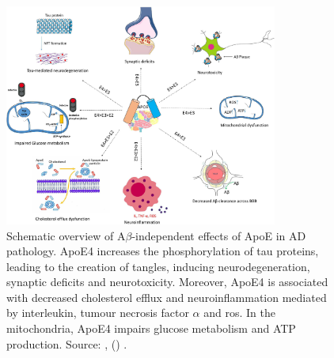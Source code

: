 \documentclass{amsart}
\begin{document}
\begin{figure}[b]
  \includegraphics[width=0.8\textwidth]{figures/ApoEeffectsA.jpg}
    \caption{Schematic overview of A$\beta$-independent effects of ApoE in AD pathology. ApoE4 increases the phosphorylation of tau proteins, leading to the creation of tangles, inducing neurodegeneration, synaptic deficits and neurotoxicity. Moreover, ApoE4 is associated with decreased cholesterol efflux and neuroinflammation mediated by interleukin, tumour necrosis factor $\alpha$ and \acrfull{ros}. In the mitochondria, ApoE4 impairs glucose metabolism and ATP production.  Source: ,  (\citeyear{Husain2021APOETherapeutics}) \cite{Husain2021APOETherapeutics}.}
  \label{ApoeEffectsB}
\end{figure}
\end{document}
